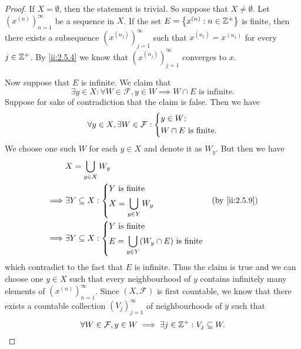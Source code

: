 \begin{proof}
  If \(X = \emptyset\), then the statement is trivial.
  So suppose that \(X \neq \emptyset\).
  Let \((x^{(n)})_{n = 1}^\infty\) be a sequence in \(X\).
  If the set \(E = \left\lbrace x^{(n)} : n \in \mathbb{Z}^+\right\rbrace\) is finite, then there exists a subsequence \((x^{(n_j)})_{j = 1}^\infty\) such that \(x^{(n_j)} = x^{(n_1)}\) for every \(j \in \mathbb{Z}^+\).
  By \cref{ii:2.5.4} we know that \((x^{(n_j)})_{j = 1}^\infty\) converges to \(x\).

  Now suppose that \(E\) is infinite.
  We claim that
  \[
    \exists y \in X : \forall W \in \mathcal{F}, y \in W \implies W \cap E \text{ is infinite}.
  \]
  Suppose for sake of contradiction that the claim is false.
  Then we have
  \[
    \forall y \in X, \exists W \in \mathcal{F} : \begin{dcases}
      y \in W; \\
      W \cap E \text{ is finite}.
    \end{dcases}
  \]
  We choose one such \(W\) for each \(y \in X\) and denote it as \(W_y\).
  But then we have
  \begin{align*}
             & X = \bigcup_{y \in X} W_y                                                   \\
    \implies & \exists Y \subseteq X : \begin{dcases}
                                         Y \text{ is finite} \\
                                         X = \bigcup_{y \in Y} W_y
                                       \end{dcases}               &  & \by{ii:2.5.9}          \\
    \implies & \exists Y \subseteq X : \begin{dcases}
                                         Y \text{ is finite} \\
                                         E = \bigcup_{y \in Y} (W_y \cap E) \text{ is finite}
                                       \end{dcases}
  \end{align*}
  which contradict to the fact that \(E\) is infinite.
  Thus the claim is true and we can choose one \(y \in X\) such that every neighbourhood of \(y\) contains infinitely many elements of \((x^{(n)})_{n = 1}^\infty\).
  Since \((X, \mathcal{F})\) is first countable, we know that there exists a countable collection \((V_j)_{j = 1}^\infty\) of neighbourhoods of \(y\) such that
  \[
    \forall W \in \mathcal{F}, y \in W \implies \exists j \in \mathbb{Z}^+ : V_j \subseteq W.
\]
\end{proof}
